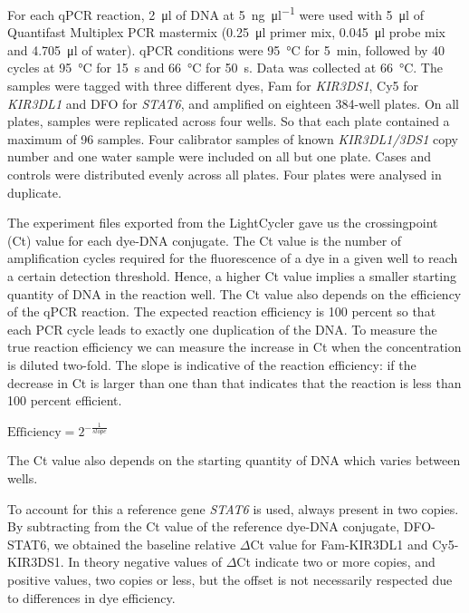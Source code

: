 For each qPCR reaction, \SI{2}{\micro\litre} of DNA at
\SI{5}{\nano\gram\per\micro\litre} were used with \SI{5}{\micro\litre} of
Quantifast Multiplex PCR mastermix (\SI{0.25}{\micro\litre} primer mix,
\SI{0.045}{\micro\litre} probe mix and \SI{4.705}{\micro\litre} of water).
qPCR conditions were \SI{95}{\degreeCelsius} for \SI{5}{\minute}, followed by 40
cycles at \SI{95}{\degreeCelsius} for \SI{15}{\second} and
\SI{66}{\degreeCelsius} for \SI{50}{\second}.  Data was collected at
\SI{66}{\degreeCelsius}.  The samples were tagged with three different dyes,
Fam for \emph{KIR3DS1}, Cy5 for \emph{KIR3DL1} and DFO for \emph{STAT6}, and
amplified on eighteen 384-well plates.  On all plates, samples were replicated
across four wells.  So that each plate contained a maximum of 96 samples.  Four
calibrator samples of known \emph{KIR3DL1/3DS1} copy number and one water
sample were included on all but one plate.  Cases and controls were distributed
evenly across all plates.  Four plates were analysed in duplicate.


The experiment files exported from the LightCycler gave us the crossingpoint (Ct) value for each dye-DNA conjugate.
The Ct value is the number of amplification cycles required for the fluorescence of a dye in a given well to reach a certain detection threshold.
Hence, a higher Ct value implies a smaller starting quantity of DNA in the reaction well.
The Ct value also depends on the efficiency of the qPCR reaction.
The expected reaction efficiency is 100 percent so that each PCR cycle leads to exactly one duplication of the DNA.
To measure the true reaction efficiency we can measure the increase in Ct when the concentration is diluted two-fold.
The slope is indicative of the reaction efficiency: 
if the decrease in Ct is larger than one than that indicates that the reaction is less than 100 percent efficient.

$ \textrm{Efficiency} = 2^{-\frac{1}{slope}} $

The Ct value also depends on the starting quantity of DNA which varies between wells.

To account for this a reference gene \emph{STAT6} is used, always present in two copies.
By subtracting from the Ct value of the reference dye-DNA conjugate, DFO-STAT6, we obtained the baseline relative $\Delta$Ct value for Fam-KIR3DL1 and Cy5-KIR3DS1.  
In theory negative values of $\Delta$Ct indicate two or more copies, and positive values, two copies or less, but the offset is not necessarily respected due to differences in dye efficiency.


